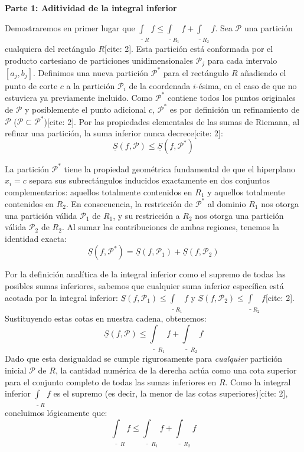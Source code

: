 \documentclass[11pt,letterpaper]{article}
\begin{document}
\vspace{0.5cm}
\textbf{Parte 1: Aditividad de la integral inferior}

Demostraremos en primer lugar que $\underline{\int}_{R}f \le \underline{\int}_{R_{1}}f + \underline{\int}_{R_{2}}f$.
Sea $\mathcal{P}$ una partición cualquiera del rectángulo $R$[cite: 2]. Esta partición está conformada por el producto cartesiano de particiones unidimensionales $\mathcal{P}_{j}$ para cada intervalo $[a_{j}, b_{j}]$.
Definimos una nueva partición $\mathcal{P}^{*}$ para el rectángulo $R$ añadiendo el punto de corte $c$ a la partición $\mathcal{P}_{i}$ de la coordenada $i$-ésima, en el caso de que no estuviera ya previamente incluido. Como $\mathcal{P}^{*}$ contiene todos los puntos originales de $\mathcal{P}$ y posiblemente el punto adicional $c$, $\mathcal{P}^{*}$ es por definición un refinamiento de $\mathcal{P}$ ($\mathcal{P} \subset \mathcal{P}^{*}$)[cite: 2]. Por las propiedades elementales de las sumas de Riemann, al refinar una partición, la suma inferior nunca decrece[cite: 2]:
\begin{equation*}
\underline{S}(f, \mathcal{P}) \le \underline{S}(f, \mathcal{P}^{*})
\end{equation*}

La partición $\mathcal{P}^{*}$ tiene la propiedad geométrica fundamental de que el hiperplano $x_{i} = c$ separa sus subrectángulos inducidos exactamente en dos conjuntos complementarios: aquellos totalmente contenidos en $R_{1}$ y aquellos totalmente contenidos en $R_{2}$. En consecuencia, la restricción de $\mathcal{P}^{*}$ al dominio $R_{1}$ nos otorga una partición válida $\mathcal{P}_{1}$ de $R_{1}$, y su restricción a $R_{2}$ nos otorga una partición válida $\mathcal{P}_{2}$ de $R_{2}$. Al sumar las contribuciones de ambas regiones, tenemos la identidad exacta:
\begin{equation*}
\underline{S}(f, \mathcal{P}^{*}) = \underline{S}(f, \mathcal{P}_{1}) + \underline{S}(f, \mathcal{P}_{2})
\end{equation*}

Por la definición analítica de la integral inferior como el supremo de todas las posibles sumas inferiores, sabemos que cualquier suma inferior específica está acotada por la integral inferior: $\underline{S}(f, \mathcal{P}_{1}) \le \underline{\int}_{R_{1}}f$ y $\underline{S}(f, \mathcal{P}_{2}) \le \underline{\int}_{R_{2}}f$[cite: 2]. Sustituyendo estas cotas en nuestra cadena, obtenemos:
\begin{equation*}
\underline{S}(f, \mathcal{P}) \le \underline{\int}_{R_{1}}f + \underline{\int}_{R_{2}}f
\end{equation*}
Dado que esta desigualdad se cumple rigurosamente para \textit{cualquier} partición inicial $\mathcal{P}$ de $R$, la cantidad numérica de la derecha actúa como una cota superior para el conjunto completo de todas las sumas inferiores en $R$. Como la integral inferior $\underline{\int}_{R}f$ es el supremo (es decir, la menor de las cotas superiores)[cite: 2], concluimos lógicamente que:
\begin{equation*}
\underline{\int}_{R}f \le \underline{\int}_{R_{1}}f + \underline{\int}_{R_{2}}f
\end{equation*}
\end{document}

